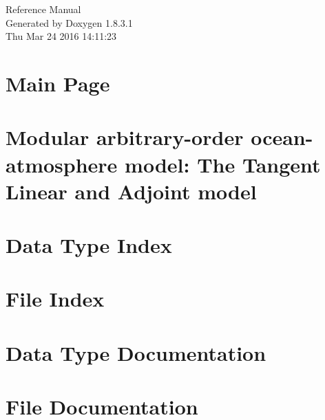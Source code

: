 \documentclass{book}
\begin{document}
\hypersetup{pageanchor=false,citecolor=blue}
\begin{titlepage}
\vspace*{7cm}
\begin{center}
{\Large Reference Manual}\\
\vspace*{1cm}
{\large Generated by Doxygen 1.8.3.1}\\
\vspace*{0.5cm}
{\small Thu Mar 24 2016 14:11:23}\\
\end{center}
\end{titlepage}
\clearemptydoublepage
{}
\tableofcontents
\clearemptydoublepage
{}
\hypersetup{pageanchor=true,citecolor=blue}
\chapter{Main Page}
\label{index}\hypertarget{index}{}
\chapter{Modular arbitrary-\/order ocean-\/atmosphere model\-: The Tangent Linear and Adjoint model}
\label{md_tl_ad_doc}
\hypertarget{md_tl_ad_doc}{}

\chapter{Data Type Index}

\chapter{File Index}

\chapter{Data Type Documentation}
















\chapter{File Documentation}

















\printindex
\end{document}

